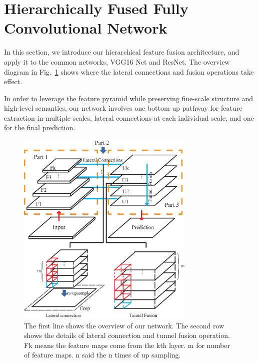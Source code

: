 \section{Hierarchically Fused Fully Convolutional Network}
\label{Sec:HF-FCN}
In this section, we introduce our hierarchical feature fusion architecture, and apply it to the common networks, VGG16 Net and ResNet.
%
The overview diagram in Fig.~\ref{fig:Fusion-Operation} shows where the lateral connections and fusion operations take effect.
%

In order to leverage the feature pyramid while preserving fine-scale structure and high-level semantics, our network involves one bottom-up pathway for feature extraction in multiple scales, lateral connections at each individual scale, and one    for the final prediction.

\begin{figure}
\centering
\includegraphics[width=8.5cm]{Figures/Fusion_Operation.eps}
\caption{The first line shows the overview of our network. The second row shows the details of lateral connection and tunnel fusion operation. Fk means the feature maps come from the kth layer. m for number of feature maps. n said the n times of up sampling.}
\label{fig:Fusion-Operation}
\end{figure}

